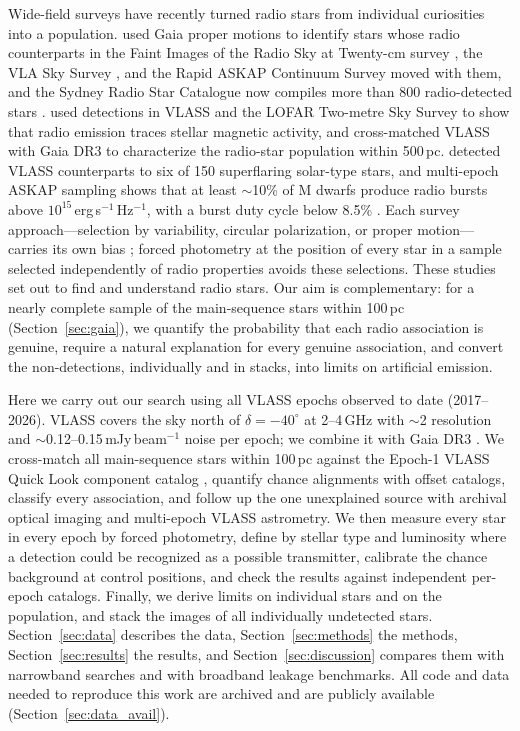 \documentclass[linenumbers]{aastex702}
\begin{document}
Wide-field surveys have recently turned radio stars from individual curiosities into a population. \citet{Driessen2023} used Gaia \citep{GaiaMission} proper motions to identify stars whose radio counterparts in the Faint Images of the Radio Sky at Twenty-cm survey \citep[FIRST;][]{Becker1995}, the VLA Sky Survey \citep[VLASS;][]{Lacy2020}, and the Rapid ASKAP Continuum Survey \citep[RACS;][]{McConnell2020} moved with them, and the Sydney Radio Star Catalogue now compiles more than 800 radio-detected stars \citep{Driessen2024}. \citet{Yiu2024} used detections in VLASS and the LOFAR Two-metre Sky Survey \citep[LoTSS;][]{Shimwell2022} to show that radio emission traces stellar magnetic activity, and \citet{De2024} cross-matched VLASS with Gaia DR3 to characterize the radio-star population within 500\,pc. \citet{Davis2026} detected VLASS counterparts to six of 150 superflaring solar-type stars, and multi-epoch ASKAP sampling shows that at least $\sim$10\% of M dwarfs produce radio bursts above $10^{15}$\,erg\,s$^{-1}$\,Hz$^{-1}$, with a burst duty cycle below 8.5\% \citep{Pritchard2024}. Each survey approach---selection by variability, circular polarization, or proper motion---carries its own bias \citep{Matthews2025}; forced photometry at the position of every star in a sample selected independently of radio properties avoids these selections. These studies set out to find and understand radio stars. Our aim is complementary: for a nearly complete sample of the main-sequence stars within 100\,pc (Section~\ref{sec:gaia}), we quantify the probability that each radio association is genuine, require a natural explanation for every genuine association, and convert the non-detections, individually and in stacks, into limits on artificial emission.

Here we carry out our search using all VLASS epochs observed to date (2017--2026). VLASS covers the sky north of $\delta=-40^\circ$ at 2--4\,GHz with $\sim$2 resolution and $\sim$0.12--0.15\,mJy\,beam$^{-1}$ noise per epoch; we combine it with Gaia DR3 \citep{GaiaDR3}. We cross-match all main-sequence stars within 100\,pc against the Epoch-1 VLASS Quick Look component catalog \citep{Gordon2020,Gordon2021}, quantify chance alignments with offset catalogs, classify every association, and follow up the one unexplained source with archival optical imaging and multi-epoch VLASS astrometry. We then measure every star in every epoch by forced photometry, define by stellar type and luminosity where a detection could be recognized as a possible transmitter, calibrate the chance background at control positions, and check the results against independent per-epoch catalogs. Finally, we derive limits on individual stars and on the population, and stack the images of all individually undetected stars. Section~\ref{sec:data} describes the data, Section~\ref{sec:methods} the methods, Section~\ref{sec:results} the results, and Section~\ref{sec:discussion} compares them with narrowband searches and with broadband leakage benchmarks. All code and data needed to reproduce this work are archived and are publicly available (Section~\ref{sec:data_avail}).
\end{document}
